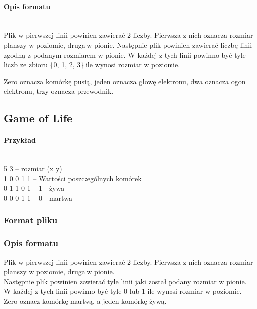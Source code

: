 \documentclass{report}
\begin{document}
\paragraph{Opis formatu}\mbox{}\\
Plik w pierwszej linii powinien zawierać 2 liczby. Pierwsza z nich oznacza rozmiar planszy w poziomie, druga w pionie.
Następnie plik powinien zawierać liczbę linii zgodną z podanym rozmiarem w pionie. W każdej z tych linii powinno być tyle liczb ze zbioru \{0, 1, 2, 3\} ile wynosi rozmiar w poziomie.

Zero oznacza komórkę pustą, jeden oznacza głowę elektronu, dwa oznacza ogon elektronu, trzy oznacza przewodnik.

\subsection{Game of Life}

\paragraph{Przykład} \mbox{} \\
5 3 \tab -- rozmiar (x y) \\
1 0 0 1 1 \tab -- Wartości poszczególnych komórek \\
0 1 1 0 1 \tab -- 1 - żywa \\
0 0 0 1 1 \tab -- 0 - martwa \\

\subsubsection{Format pliku}

\subsubsection*{Opis formatu}
Plik w pierwszej linii powinien zawierać 2 liczby. Pierwsza z nich oznacza rozmiar planszy w poziomie, druga w pionie. \\
Następnie plik powinien zawierać tyle linii jaki został podany rozmiar w pionie. W każdej z tych linii powinno być tyle 0 lub 1 ile wynosi rozmiar w poziomie. \\
Zero oznacz komórkę martwą, a jeden komórkę żywą.
\end{document}
